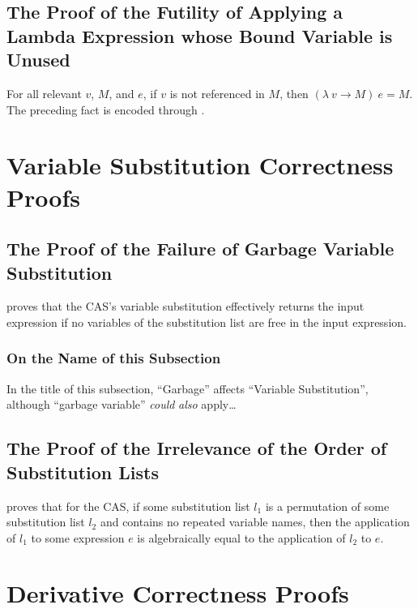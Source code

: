 \documentclass{report}
\begin{document}
\subsection{The Proof of the Futility of Applying a Lambda Expression whose Bound Variable is Unused}
For all relevant \(v\), \(M\), and \(e\), if \(v\) is not referenced in \(M\), then \(\left(\lambda\ v \rightarrow M\right)\ e = M\).  The preceding fact is encoded through .

\section{Variable Substitution Correctness Proofs}

\subsection{The Proof of the Failure of Garbage Variable Substitution}
  proves that the  CAS's variable substitution effectively returns the input expression if no variables of the substitution list are free in the input expression.

\subsubsection{On the Name of this Subsection}\label{sec:garbageVariableSubstitutionPseudoFootnote} %
In the title of this subsection, ``Garbage'' affects ``Variable Substitution'', although ``garbage variable'' \emph{could} \emph{also} apply\ldots

\subsection{The Proof of the Irrelevance of the Order of Substitution Lists}
  proves that for the  CAS, if some substitution list \(l_1\) is a permutation of some substitution list \(l_2\) and contains no repeated variable names, then the application of \(l_1\) to some expression \(e\) is algebraically equal to the application of \(l_2\) to \(e\).

\section{Derivative Correctness Proofs}
\end{document}

